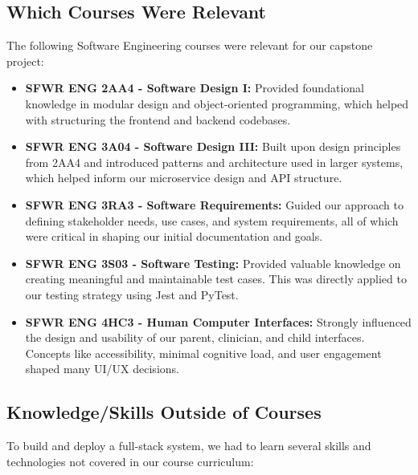 \documentclass{article}
\begin{document}
\subsection{Which Courses Were Relevant}

The following Software Engineering courses were relevant for our capstone project: 

\begin{itemize}
    \item \textbf{SFWR ENG 2AA4 - Software Design I:} Provided foundational knowledge in modular design and object-oriented programming, which helped with structuring the frontend and backend codebases.
    
    \item \textbf{SFWR ENG 3A04 - Software Design III:} Built upon design principles from 2AA4 and introduced patterns and architecture used in larger systems, which helped inform our microservice design and API structure.
    
    \item \textbf{SFWR ENG 3RA3 - Software Requirements:} Guided our approach to defining stakeholder needs, use cases, and system requirements, all of which were critical in shaping our initial documentation and goals.
    
    \item \textbf{SFWR ENG 3S03 - Software Testing:} Provided valuable knowledge on creating meaningful and maintainable test cases. This was directly applied to our testing strategy using Jest and PyTest.
    
    \item \textbf{SFWR ENG 4HC3 - Human Computer Interfaces:} Strongly influenced the design and usability of our parent, clinician, and child interfaces. Concepts like accessibility, minimal cognitive load, and user engagement shaped many UI/UX decisions.
\end{itemize}


\subsection{Knowledge/Skills Outside of Courses}

\hspace{2em} To build and deploy a full-stack system, we had to learn several skills and technologies not covered in our course curriculum:
\end{document}
